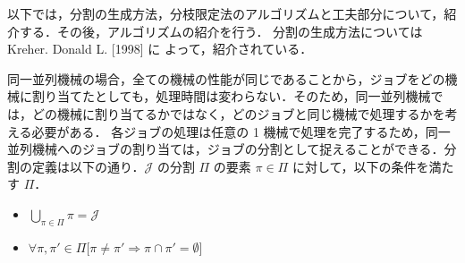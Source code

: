 \documentclass[12pt]{optlab-bachelor}
\begin{document}
以下では，分割の生成方法，分枝限定法のアルゴリズムと工夫部分について，紹介する．その後，アルゴリズムの紹介を行う．
分割の生成方法については Kreher. Donald L. [1998] \cite{rgf} に
よって，紹介されている．

同一並列機械の場合，全ての機械の性能が同じであることから，ジョブをどの機械に割り当てたとしても，処理時間は変わらない．そのため，同一並列機械では，どの機械に割り当てるかではなく，どのジョブと同じ機械で処理するかを考える必要がある．
各ジョブの処理は任意の 1 機械で処理を完了するため，同一並列機械へのジョブの割り当ては，ジョブの分割として捉えることができる．分割の定義は以下の通り．$\mathcal{J}$ の分割 $\Pi$ の要素 $\pi \in \Pi$ に対して，以下の条件を満たす $\Pi$．
\begin{itemize}
  \item $\displaystyle \bigcup_{\pi \in \Pi}\pi = \mathcal{J} $
  \item $\forall \pi, \pi' \in \Pi \big[\pi \neq \pi' \Rightarrow \pi \cap \pi' = \emptyset \big]$
\end{itemize}
\end{document}
